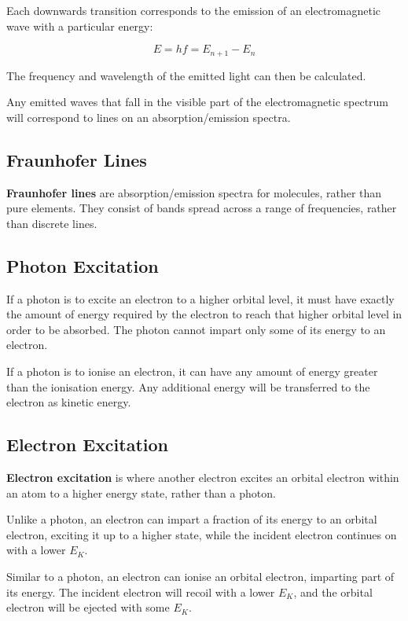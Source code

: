 \documentclass[a4paper,11pt]{report}
\begin{document}

Each downwards transition corresponds to the emission of an electromagnetic
wave with a particular energy:

$$
E = hf = E_{n + 1} - E_n
$$

The frequency and wavelength of the emitted light can then be calculated.

Any emitted waves that fall in the visible part of the electromagnetic spectrum
will correspond to lines on an absorption/emission spectra.

\subsection{Fraunhofer Lines}

\textbf{Fraunhofer lines} are absorption/emission spectra for molecules, rather
than pure elements. They consist of bands spread across a range of frequencies,
rather than discrete lines.

\subsection{Photon Excitation}

If a photon is to excite an electron to a higher orbital level, it must have
exactly the amount of energy required by the electron to reach that higher
orbital level in order to be absorbed. The photon cannot impart only some of
its energy to an electron.

If a photon is to ionise an electron, it can have any amount of energy greater
than the ionisation energy. Any additional energy will be transferred to the
electron as kinetic energy.

\subsection{Electron Excitation}

\textbf{Electron excitation} is where another electron excites an orbital
electron within an atom to a higher energy state, rather than a photon.

Unlike a photon, an electron can impart a fraction of its energy to an orbital
electron, exciting it up to a higher state, while the incident electron
continues on with a lower $E_K$.

Similar to a photon, an electron can ionise an orbital electron, imparting
part of its energy. The incident electron will recoil with a lower $E_K$, and
the orbital electron will be ejected with some $E_K$.
\end{document}
